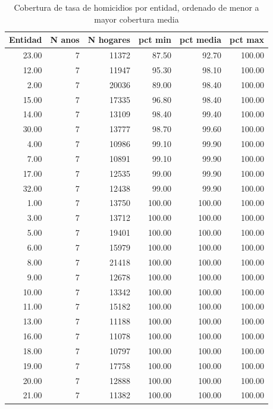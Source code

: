 \begin{table}[ht]
\centering
\caption{Cobertura de tasa de homicidios por entidad, ordenado de menor a mayor cobertura media} 
\label{tab:15_cobertura_tasa_por_entidad}
\begin{tabular}{rrrrrr}
  \toprule
Entidad & N anos & N hogares & pct min & pct media & pct max \\ 
  \midrule
23.00 &   7 & 11372 & 87.50 & 92.70 & 100.00 \\ 
  12.00 &   7 & 11947 & 95.30 & 98.10 & 100.00 \\ 
  2.00 &   7 & 20036 & 89.00 & 98.40 & 100.00 \\ 
  15.00 &   7 & 17335 & 96.80 & 98.40 & 100.00 \\ 
  14.00 &   7 & 13109 & 98.40 & 99.40 & 100.00 \\ 
  30.00 &   7 & 13777 & 98.70 & 99.60 & 100.00 \\ 
  4.00 &   7 & 10986 & 99.10 & 99.90 & 100.00 \\ 
  7.00 &   7 & 10891 & 99.10 & 99.90 & 100.00 \\ 
  17.00 &   7 & 12535 & 99.00 & 99.90 & 100.00 \\ 
  32.00 &   7 & 12438 & 99.00 & 99.90 & 100.00 \\ 
  1.00 &   7 & 13750 & 100.00 & 100.00 & 100.00 \\ 
  3.00 &   7 & 13712 & 100.00 & 100.00 & 100.00 \\ 
  5.00 &   7 & 19401 & 100.00 & 100.00 & 100.00 \\ 
  6.00 &   7 & 15979 & 100.00 & 100.00 & 100.00 \\ 
  8.00 &   7 & 21418 & 100.00 & 100.00 & 100.00 \\ 
  9.00 &   7 & 12678 & 100.00 & 100.00 & 100.00 \\ 
  10.00 &   7 & 13342 & 100.00 & 100.00 & 100.00 \\ 
  11.00 &   7 & 15182 & 100.00 & 100.00 & 100.00 \\ 
  13.00 &   7 & 11188 & 100.00 & 100.00 & 100.00 \\ 
  16.00 &   7 & 11078 & 100.00 & 100.00 & 100.00 \\ 
  18.00 &   7 & 10797 & 100.00 & 100.00 & 100.00 \\ 
  19.00 &   7 & 17758 & 100.00 & 100.00 & 100.00 \\ 
  20.00 &   7 & 12888 & 100.00 & 100.00 & 100.00 \\ 
  21.00 &   7 & 11382 & 100.00 & 100.00 & 100.00 \\ 

\end{tabular}
\end{table}
